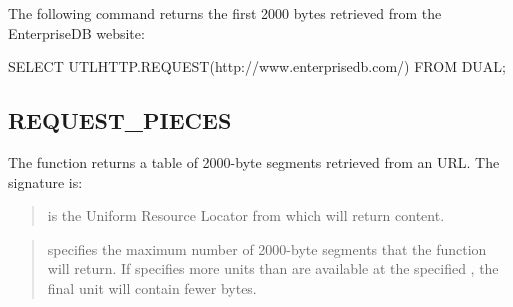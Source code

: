 \documentclass[letterpaper,10pt,english,openany,oneside]{sphinxmanual}
\begin{document}

The following command returns the first 2000 bytes retrieved from the
EnterpriseDB website:

%
\begin{sphinxVerbatim}[commandchars=\\\{\}]
SELECT UTL\PYGZus{}HTTP.REQUEST(\PYGZsq{}http://www.enterprisedb.com/\PYGZsq{}) FROM DUAL;
\end{sphinxVerbatim}

\newpage


\subsection{REQUEST\_PIECES}
\label{\detokenize{utl_http:request-pieces}}
The  function returns a table of 2000-byte segments
retrieved from an URL. The signature is:
\begin{quote}

\begin{DUlineblock}{0em}
\item[] 
\item[] 
\end{DUlineblock}
\end{quote}


\begin{quote}

 is the Uniform Resource Locator from which  will
return content.
\end{quote}

\begin{quote}

 specifies the maximum number of 2000-byte segments
that the  function will return. If 
specifies more units than are available at the specified , the
final unit will contain fewer bytes.
\end{quote}

\end{document}
